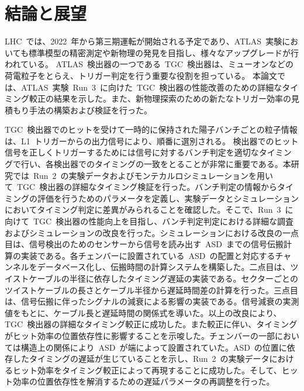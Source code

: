 \chapter{結論と展望}
\thispagestyle{empty}
\label{chap:7}
LHC~では、2022~年から第三期運転が開始される予定であり、ATLAS~実験においても標準模型の精密測定や新物理の発見を目指し、様々なアップグレードが行われている。
ATLAS~検出器の一つである~TGC~検出器は、ミューオンなどの荷電粒子をとらえ、トリガー判定を行う重要な役割を担っている。
本論文では、ATLAS~実験~Run~3~に向けた~TGC~検出器の性能改善のための詳細なタイミング較正の結果を示した。また、新物理探索のための新たなトリガー効率の見積もり手法の構築および検証を行った。

TGC~検出器でのヒットを受けて一時的に保持された陽子バンチごとの粒子情報は、L1~トリガーからの出力信号により、順番に選別される。
検出器でのヒット信号を正しくトリガーするためには信号に対するバンチ判定を適切なタイミングで行い、各検出器でのタイミングの一致をとることが非常に重要である。本研究では~Run~2~の実験データおよびモンテカルロシミュレーションを用いて~TGC~検出器の詳細なタイミング検証を行った。バンチ判定の情報からタイミングの評価を行うためのパラメータを定義し、実験データとシミュレーションにおいてタイミング判定に差異がみられることを確認した。そこで、Run~3~に向けて~TGC~検出器の性能向上を目指し、バンチ判定判定における詳細な調査およびシミュレーションの改良を行った。シミュレーションにおける改良の一点目は、信号検出のためのセンサーから信号を読み出す~ASD~までの信号伝搬計算の実装である。各チェンバーに設置されている~ASD~の配置と対応するチャンネルをデータベース化し、伝搬時間の計算システムを構築した。二点目は、ツイストケーブルの半径に依存したタイミング遅延の実装である。セクターごとのツイストケーブルの長さとケーブル半径から遅延時間差の計算を行った。三点目は、信号伝搬に伴ったシグナルの減衰による影響の実装である。信号減衰の実測値をもとに、ケーブル長と遅延時間の関係式を導いた。以上の改良により、TGC~検出器の詳細なタイミング較正に成功した。また較正に伴い、タイミングがヒット効率の位置依存性に影響することを示唆した。チェンバーの一部においては構造上の関係により~ASD~が端によって設置されていた。ASD~の位置に依存したタイミングの遅延が生じていることを示し、Run~2~の実験データにおけるヒット効率をタイミング較正によって再現することに成功した。そして、ヒット効率の位置依存性を解消するための遅延パラメータの再調整を行った。

